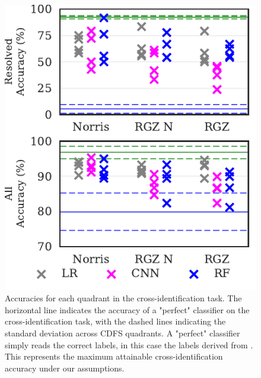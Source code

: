 \documentclass[fleqn,usenatbib,usedcolumn]{mnras}
\begin{document}
  \begin{figure}
  \centering
  \includegraphics[width=\columnwidth]{images/cdfs_cross_identification_grid.pdf}
  \caption{Accuracies for each quadrant in the cross-identification
    task. The horizontal line indicates the accuracy of a "perfect" classifier
    on the cross-identification task, with the dashed lines indicating the
    standard deviation across CDFS quadrants. A "perfect" classifier simply
    reads the correct labels, in this case the labels derived from
    \citet{norris06}. This represents the maximum attainable cross-identification
    accuracy under our assumptions.
    \label{fig:cross-id-accuracy}}
  \end{figure}
\end{document}
